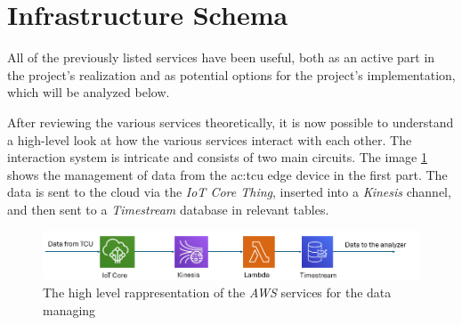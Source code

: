 \begin{itemize}
\end{itemize}

\section{Infrastructure Schema}
All of the previously listed services have been useful, both as an active part in the project's realization and as potential options for the project's implementation, which will be analyzed below. 

After reviewing the various services theoretically, it is now possible to understand a high-level look at how the various services interact with each other.
The interaction system is intricate and consists of two main circuits. The image \ref{fig:AWSDataServices} shows the management of data from the \gls{ac:tcu} edge device in the first part. The data is sent to the cloud via the \textit{IoT Core Thing}, inserted into a \textit{Kinesis} channel, and then sent to a \textit{Timestream} database in relevant tables.
\begin{figure}[h]  %
    \centering
    \includegraphics[width=1\textwidth]{images/AWS_data_services.png}  %
    \caption{The high level rappresentation of the \textit{AWS} services for the data managing}
    \label{fig:AWSDataServices}
\end{figure}

